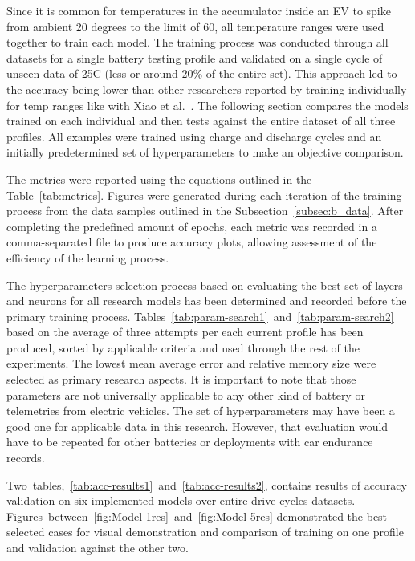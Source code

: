 Since it is common for temperatures in the accumulator inside an EV to spike from ambient 20 degrees to the limit of 60, all temperature ranges were used together to train each model.
The training process was conducted through all datasets for a single battery testing profile and validated on a single cycle of unseen data of 25\textdegree{}C (less or around 20\% of the entire set).
This approach led to the accuracy being lower than other researchers reported by training individually for temp ranges like with Xiao et al.~\cite{xiao_accurate_2019}.
The following section compares the models trained on each individual and then tests against the entire dataset of all three profiles.
All examples were trained using charge and discharge cycles and an initially predetermined set of hyperparameters to make an objective comparison.

%
%
The metrics were reported using the equations outlined in the \mbox{Table~\ref{tab:metrics}}.
Figures were generated during each iteration of the training process from the data samples outlined in the \mbox{Subsection~\ref{subsec:b_data}}.
After completing the predefined amount of epochs, each metric was recorded in a comma-separated file to produce accuracy plots, allowing assessment of the efficiency of the learning process.

%
The hyperparameters selection process based on evaluating the best set of layers and neurons for all research models has been determined and recorded before the primary training process.
\mbox{Tables~\ref{tab:param-search1} and~\ref{tab:param-search2}} based on the average of three attempts per each current profile has been produced, sorted by applicable criteria and used through the rest of the experiments.
The lowest mean average error and relative memory size were selected as primary research aspects.
It is important to note that those parameters are not universally applicable to any other kind of battery or telemetries from electric vehicles.
The set of hyperparameters may have been a good one for applicable data in this research.
However, that evaluation would have to be repeated for other batteries or deployments with car endurance records.

%
%
\mbox{Two tables, \ref{tab:acc-results1} and \ref{tab:acc-results2}}, contains results of accuracy validation on six implemented models over entire drive cycles datasets.
\mbox{Figures between \ref{fig:Model-1res} and \ref{fig:Model-5res}} demonstrated the best-selected cases for visual demonstration and comparison of training on one profile and validation against the other two.

